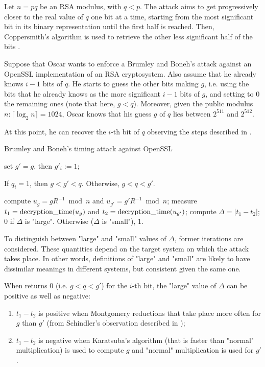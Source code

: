 Let $n = pq$ be an RSA modulus, with $q < p$. The attack aims to get progressively closer to the real value of $q$ one bit at a time, starting from the most significant bit in its binary representation until the first half is reached. Then, Coppersmith's algorithm is used to retrieve the other less significant half of the bits \cite{bib:coppersmith}.

Suppose that Oscar wants to enforce a Brumley and Boneh's attack against an OpenSSL implementation of an RSA cryptosystem. Also assume that he already knows $i - 1$ bits of $q$. He starts to guess the other bits making $g$, i.e. using the bits that he already knows as the more significant $i - 1$ bits of $g$, and setting to $0$ the remaining ones (note that here, $g < q$). Moreover, given the public modulus $n: \lceil \log_2n \rceil = 1024$, Oscar knows that his guess $g$ of $q$ lies between $2^{511}$ and $2^{512}$.

At this point, he can recover the $i$-th bit of $q$ observing the steps described in .

\begin{algorithm}
\caption{Brumley and Boneh's timing attack against OpenSSL}\label{alg:three}
\begin{algorithmic}[1]
  \State set $g' = g$, then $g'_i := 1$;
  \begin{scriptsize}
    \Comment If $q_i = 1$, then $g < g' < q$. Otherwise, $g < q < g'$.
  \end{scriptsize}
  \State compute $u_g = gR^{-1} \bmod n$ and $u_{g'} = g'R^{-1} \bmod n$;
  \State measure $t_1 = \operatorname{decryption\_time}(u_g)$ and $t_2 = \operatorname{decryption\_time}(u_{g'})$;
  \State compute $\Delta = \left| t_1 - t_2 \right|$;
  \State \Return $0$ if $\Delta$ is "large". Otherwise ($\Delta$ is "small"), \Return $1$.
\end{algorithmic}
\end{algorithm}

To distinguish between "large" and "small" values of $\Delta$, former iterations are considered. These quantities depend on the target system on which the attack takes place. In other words, definitions of "large" and "small" are likely to have dissimilar meanings in different systems, but consistent given the same one.

When  returns $0$ (i.e. $g < q < g'$) for the $i$-th bit, the "large" value of $\Delta$ can be positive as well as negative:
\begin{enumerate}[label=(\roman*)]
  \item $t_1 - t_2$ is positive when Montgomery reductions that take place more often for $g$ than $g'$ (from Schindler's observation described in );
  \item $t_1 - t_2$ is negative when Karatsuba's algorithm (that is faster than "normal" multiplication) is used to compute $g$ and "normal" multiplication is used for $g'$.
\end{enumerate}

